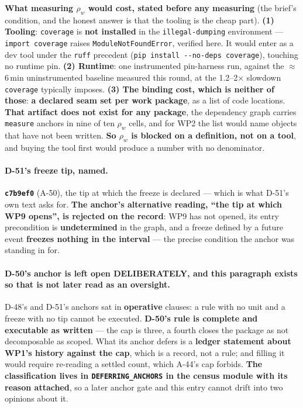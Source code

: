 \documentclass[
  10pt,
]{article}
\begin{document}
\textbf{What measuring $\rho_w$ would cost, stated before any measuring} (the brief's condition, and the honest answer is that the tooling is the cheap part). \textbf{(1) Tooling}: \texttt{coverage} is \textbf{not installed} in the \texttt{illegal-dumping} environment --- \texttt{import coverage} raises \texttt{ModuleNotFoundError}, verified here. It would enter as a dev tool under the \texttt{ruff} precedent (\texttt{pip install -{}-no-deps coverage}), touching no runtime pin. \textbf{(2) Runtime}: one instrumented pin-harness run, against the $\approx$6\,min uninstrumented baseline measured this round, at the 1.2--2$\times$ slowdown \texttt{coverage} typically imposes. \textbf{(3) The binding cost, which is neither of those}: \textbf{a declared seam set per work package}, as a list of code locations. \textbf{That artifact does not exist for any package}, the dependency graph carries \texttt{measure} anchors in nine of ten $\rho_w$ cells, and for WP2 the list would name objects that have not been written. \textbf{So $\rho_w$ is blocked on a definition, not on a tool}, and buying the tool first would produce a number with no denominator.

\paragraph{D-51's freeze tip, named.}
\textbf{\texttt{c7b9ef0}} (A-50), the tip at which the freeze is declared --- which is what D-51's own text asks for. \textbf{The anchor's alternative reading, ``the tip at which WP9 opens'', is rejected on the record}: WP9 has not opened, its entry precondition is \textbf{undetermined} in the graph, and a freeze defined by a future event \textbf{freezes nothing in the interval} --- the precise condition the anchor was standing in for.

\paragraph{D-50's anchor is left open DELIBERATELY, and this paragraph exists so that is not later read as an oversight.}
D-48's and D-51's anchors sat in \textbf{operative} clauses: a rule with no unit and a freeze with no tip cannot be executed. \textbf{D-50's rule is complete and executable as written} --- the cap is three, a fourth closes the package as not decomposable as scoped. What its anchor defers is a \textbf{ledger statement about WP1's history against the cap}, which is a record, not a rule; and filling it would require re-reading a settled count, which A-44's cap forbids. \textbf{The classification lives in \texttt{DEFERRING\_ANCHORS} in the census module with its reason attached}, so a later anchor gate and this entry cannot drift into two opinions about it.
\end{document}
